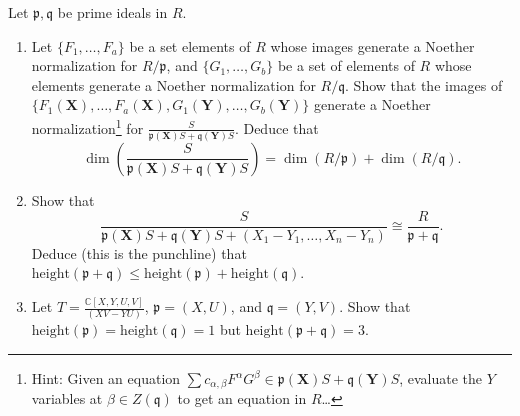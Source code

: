 \documentclass[12pt]{amsart}
\newcommand{\C}{\mathbb{C}}
\newcommand{\X}{\mathbf{X}}
\newcommand{\Y}{\mathbf{Y}}
\newcommand{\p}{\mathfrak{p}}
\newcommand{\q}{\mathfrak{q}}
\newcommand{\hgt}{\mathrm{height}}
\newcommand{\ds}{\displaystyle}
\begin{document}
\begin{enumerate}
 Let $\p,\q$ be prime ideals in $R$.
 \begin{enumerate}
\item Let $\{F_1,\dots,F_a\}$ be a set elements of $R$ whose images generate a Noether normalization for $R/\p$, and $\{G_1,\dots,G_b\}$ be a set of elements of $R$ whose elements generate a Noether normalization for $R/\q$. Show that the images of $\{F_1(\X),\dots,F_a(\X),G_1(\Y),\dots,G_b(\Y)\}$ generate a Noether normalization\footnote{Hint: Given an equation $\sum c_{\alpha,\beta} F^\alpha G^\beta \in \p(\X) S + \q(\Y) S$, evaluate the $Y$ variables at $\beta\in Z(\q)$ to get an equation in $R$\dots} for $\ds\frac{S}{\p(\X) S + \q(\Y)S}$. Deduce that 
\[\dim\left(\frac{S}{\p(\X) S + \q(\Y)S}\right) = \dim(R/\p) + \dim(R/\q).\]
\item Show that \[\frac{S}{\p(\X) S + \q(\Y)S + (X_1-Y_1,\dots,X_n-Y_n)}\cong \frac{R}{\p+\q}.\] Deduce (this is the punchline) that $\hgt(\p+\q) \leq \hgt(\p) + \hgt(\q)$.
\item Let $\ds T=\frac{\C[X,Y,U,V]}{(XV-YU)}$, $\p=(X,U)$, and $\q=(Y,V)$. Show that $\hgt(\p)=\hgt(\q)=1$ but $\hgt(\p+\q)=3$.
\end{enumerate}




\end{enumerate}
\end{document}
